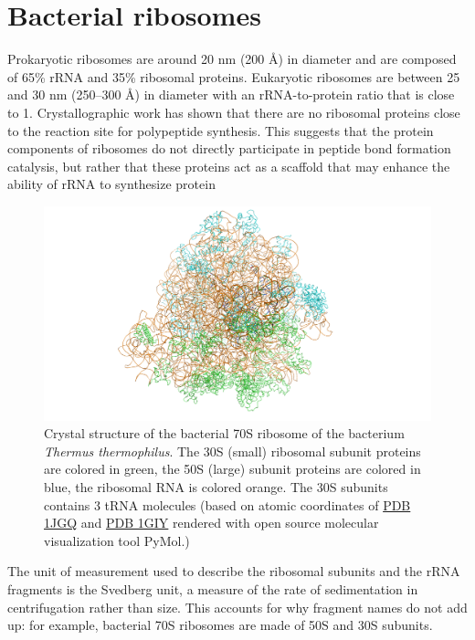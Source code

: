 \hypertarget{bacterial-ribosomes}{%
\section{Bacterial ribosomes}\label{bacterial-ribosomes}}

Prokaryotic ribosomes are around 20 nm (200 Å) in diameter and are composed of 65\% rRNA and 35\% ribosomal proteins. Eukaryotic ribosomes are between 25 and 30 nm (250--300 Å) in diameter with an rRNA-to-protein ratio that is close to 1. Crystallographic work has shown that there are no ribosomal proteins close to the reaction site for polypeptide synthesis. This suggests that the protein components of ribosomes do not directly participate in peptide bond formation catalysis, but rather that these proteins act as a scaffold that may enhance the ability of rRNA to synthesize protein



\begin{figure}

{\centering \includegraphics[width=0.7\linewidth]{./figures/translation/ttribosome} 

}

\caption{Crystal structure of the bacterial 70S ribosome of the bacterium \emph{Thermus thermophilus}. The 30S (small) ribosomal subunit proteins are colored in green, the 50S (large) subunit proteins are colored in blue, the ribosomal RNA is colored orange. The 30S subunits contains 3 tRNA molecules (based on atomic coordinates of \href{https://www.rcsb.org/structure/1jgq}{PDB 1JGQ} and \href{(https://www.rcsb.org/structure/1jgq)}{PDB 1GIY} rendered with open source molecular visualization tool PyMol.)}\label{fig:ttribosome}
\end{figure}

The unit of measurement used to describe the ribosomal subunits and the rRNA fragments is the Svedberg unit, a measure of the rate of sedimentation in centrifugation rather than size. This accounts for why fragment names do not add up: for example, bacterial 70S ribosomes are made of 50S and 30S subunits.

